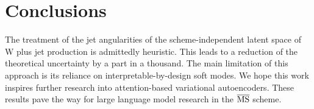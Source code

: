 \section{Conclusions}\label{sec:conclusions}

The treatment of the jet angularities of the scheme-independent latent
space of W plus jet production is admittedly heuristic. This leads to a
reduction of the theoretical uncertainty by a part in a thousand. The
main limitation of this approach is its reliance on
interpretable-by-design soft modes. We hope this work inspires further
research into attention-based variational autoencoders. These results
pave the way for large language model research in the $\overline{\rm
MS}$ scheme.

